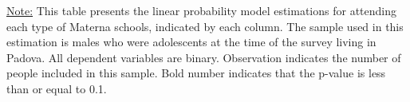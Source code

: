 \begin{footnotesize}
\noindent\underline{Note:} This table presents the linear probability model estimations for attending each type of Materna schools, indicated by each column. The sample used in this estimation is males who were adolescents at the time of the survey living in Padova. All dependent variables are binary. Observation indicates the number of people included in this sample. Bold number indicates that the p-value is less than or equal to 0.1.
\end{footnotesize}
